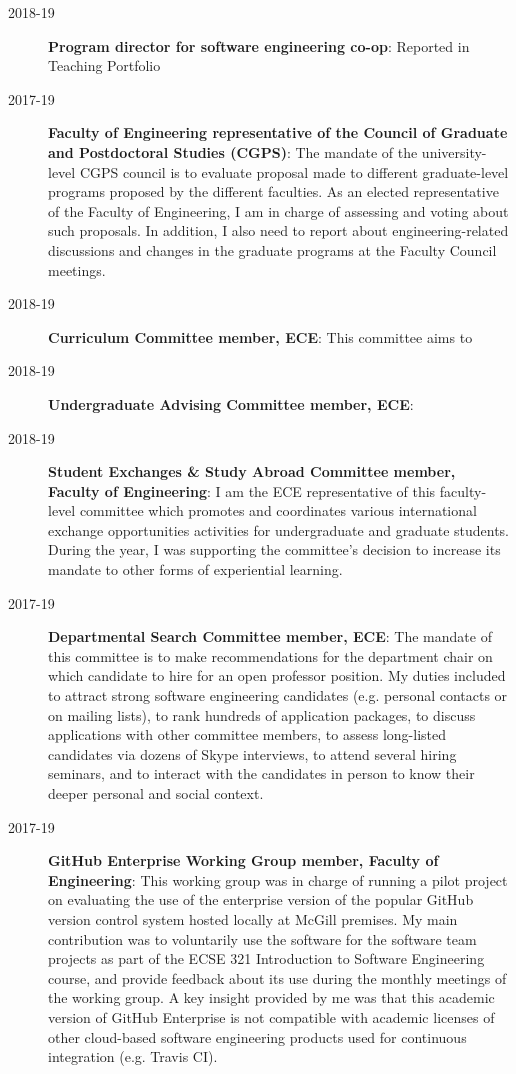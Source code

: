 \begin{description}
\item[2018-19] \textbf{Program director for software engineering co-op}: Reported in Teaching Portfolio
\item[2017-19] \textbf{Faculty of Engineering representative of the Council of Graduate and Postdoctoral Studies (CGPS)}: The mandate of the university-level CGPS council is to evaluate proposal made to different graduate-level programs proposed by the different faculties. As an elected representative of the Faculty of Engineering, I am in charge of assessing and voting about such proposals. In addition, I also need to report about engineering-related discussions and changes in the graduate programs at the Faculty Council meetings. 
\item[2018-19] \textbf{Curriculum Committee member, ECE}: This committee aims to 
\item[2018-19] \textbf{Undergraduate Advising Committee member, ECE}: 
\item[2018-19] \textbf{Student Exchanges \& Study Abroad Committee member, Faculty of Engineering}: I am the ECE representative of this faculty-level committee which promotes and coordinates various international exchange opportunities activities for undergraduate and graduate students. During the year, I was supporting the committee's decision to increase its mandate to other forms of experiential learning. 
\item[2017-19] \textbf{Departmental Search Committee member, ECE}: The mandate of this committee is to make recommendations for the department chair on which candidate to hire for an open professor position. My duties included to attract strong software engineering candidates (e.g. personal contacts or on mailing lists), to rank hundreds of application packages, to discuss applications with other committee members, to assess long-listed candidates via dozens of Skype interviews, to attend several hiring seminars, and to interact with the candidates in person to know their deeper personal and social context.
\item[2017-19] \textbf{GitHub Enterprise Working Group member, Faculty of Engineering}: This working group was in charge of running a pilot project on evaluating the use of the enterprise version of the popular GitHub version control system hosted locally at McGill premises. My main contribution was to voluntarily use the software for the software team projects as part of the ECSE 321 Introduction to Software Engineering course, and provide feedback about its use during the monthly meetings of the working group. A key insight provided by me was that this academic version of GitHub Enterprise is not compatible with academic licenses of other cloud-based software engineering products used for continuous integration (e.g. Travis CI).

\end{description}
